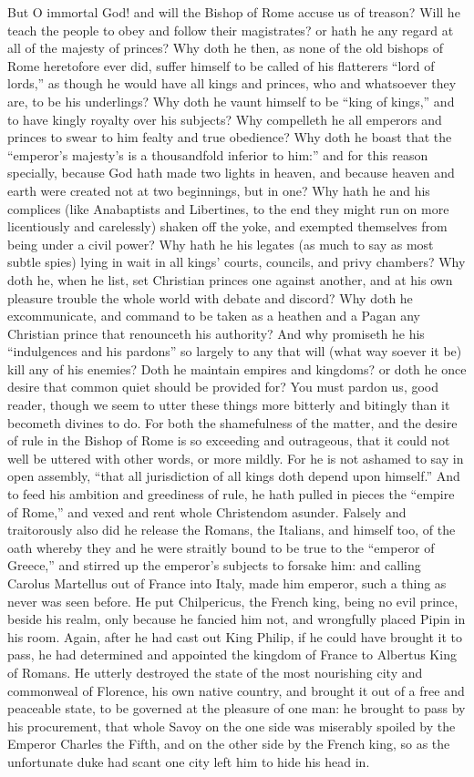 But O immortal God! and will the Bishop of Rome accuse us of treason?
Will he teach the people to obey and follow their magistrates? or hath
he any regard at all of the majesty of princes? Why doth he then,
as none of the old bishops of Rome heretofore ever did, suffer himself
to be called of his flatterers “lord of lords,” as though
he would have all kings and princes, who and whatsoever they are, to
be his underlings? Why doth he vaunt himself to be “king
of kings,” and to have kingly royalty over his subjects?
Why compelleth he all emperors and princes to swear to him fealty and
true obedience? Why doth he boast that the “emperor’s
majesty’s is a thousandfold inferior to him:”
and for this reason specially, because God hath made two lights in heaven,
and because heaven and earth were created not at two beginnings, but
in one? Why hath he and his complices (like Anabaptists and Libertines,
to the end they might run on more licentiously and carelessly) shaken
off the yoke, and exempted themselves from being under a civil power?
Why hath he his legates (as much to say as most subtle spies) lying
in wait in all kings’ courts, councils, and privy chambers?
Why doth he, when he list, set Christian princes one against another,
and at his own pleasure trouble the whole world with debate and discord?
Why doth he excommunicate, and command to be taken as a heathen and
a Pagan any Christian prince that renounceth his authority? And
why promiseth he his “indulgences and his pardons” so largely
to any that will (what way soever it be) kill any of his enemies?
Doth he maintain empires and kingdoms? or doth he once desire that common
quiet should be provided for? You must pardon us, good reader,
though we seem to utter these things more bitterly and bitingly than
it becometh divines to do. For both the shamefulness of the matter,
and the desire of rule in the Bishop of Rome is so exceeding and outrageous,
that it could not well be uttered with other
words, or more mildly. For he is not ashamed to say in open assembly,
“that all jurisdiction of all kings doth depend upon himself.”
And to feed his ambition and greediness of rule, he hath pulled in pieces
the “empire of Rome,” and vexed and rent whole Christendom
asunder. Falsely and traitorously also did he release the Romans,
the Italians, and himself too, of the oath whereby they and he were
straitly bound to be true to the “emperor of Greece,” and
stirred up the emperor’s subjects to forsake him: and calling
Carolus Martellus out of France into Italy, made him emperor, such a
thing as never was seen before. He put Chilpericus, the French
king, being no evil prince, beside his realm, only because he fancied
him not, and wrongfully placed Pipin in his room. Again, after
he had cast out King Philip, if he could have brought it to pass, he
had determined and appointed the kingdom of France to Albertus King
of Romans. He utterly destroyed the state of the most nourishing
city and commonweal of Florence, his own native country, and brought
it out of a free and peaceable state, to be governed at the pleasure
of one man: he brought to pass by his procurement, that whole Savoy
on the one side was miserably spoiled by the Emperor Charles the Fifth,
and on the other side by the French king, so as
the unfortunate duke had scant one city left him to hide his head in.

